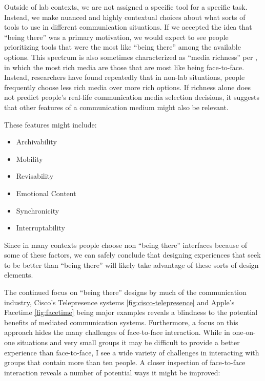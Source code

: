 
Outside of lab contexts, we are not assigned a specific tool for a specific task. Instead, we make nuanced and highly contextual choices about what sorts of tools to use in different communication situations. If we accepted the idea that ``being there'' was a primary motivation, we would expect to see people prioritizing tools that were the most like ``being there'' among the available options. This spectrum is also sometimes characterized as ``media richness'' per \citet{Daft:1986p1548}, in which the most rich media are those that are most like being face-to-face. Instead, researchers have found repeatedly that in non-lab situations, people frequently choose less rich media over more rich options. \citep{Scholl:2006p210} If richness alone does not predict people's real-life communication media selection decisions, it suggests that other features of a communication medium might also be relevant. 


These features might include:

\begin{itemize}
\item Archivability
\item Mobility
\item Revisability
\item Emotional Content
\item Synchronicity
\item Interruptability
\end{itemize}


Since in many contexts people choose non ``being there'' interfaces because of some of these factors, we can safely conclude that designing experiences that seek to be better than ``being there'' will likely take advantage of these sorts of design elements.


The continued focus on ``being there'' designs by much of the communication industry, Cisco's Telepresence systems \ref{fig:cisco-telepresence} and Apple's Facetime \ref{fig:facetime} being major examples reveals a blindness to the potential benefits of mediated communication systems. Furthermore, a focus on this approach hides the many challenges of face-to-face interaction. While in one-on-one situations and very small groups it may be difficult to provide a better experience than face-to-face, I see a wide variety of challenges in interacting with groups that contain more than ten people.  A closer inspection of face-to-face interaction reveals a number of potential ways it might be improved:


